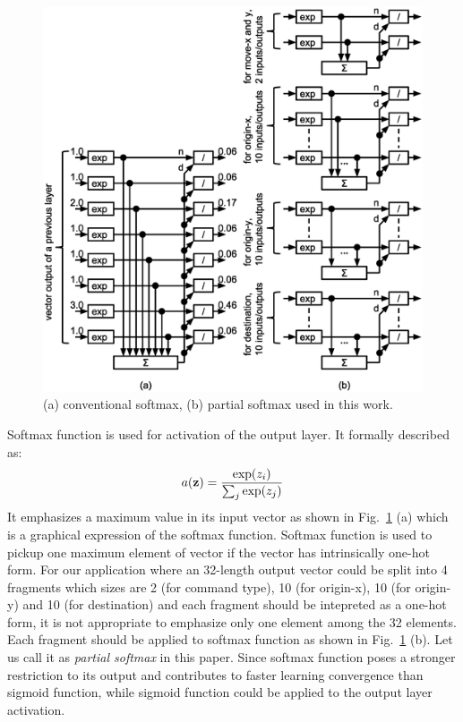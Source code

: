 \documentclass[twocolumn]{article}
\begin{document}
\begin{figure}[!tp]
 \begin{center}
  \begin{minipage}{\hsize}
   \includegraphics[width=\hsize]{fig/partial_softmax_05.eps}
   \caption{(a) conventional softmax, (b) partial softmax used in this work.}
   \label{fig:partial_softmax}
  \end{minipage}
 \end{center}
\end{figure}

Softmax function is used for activation of the output layer.
It formally described as:
\begin{eqnarray}
a({\bf z}) = \frac{\exp(z_i)}{\sum_j \exp(z_j)}
\end{eqnarray}
It emphasizes a maximum value in its input vector
as shown in Fig.\ \ref{fig:partial_softmax} (a)
which is a graphical expression of the softmax function.
Softmax function is used to pickup one maximum element of vector
if the vector has intrinsically one-hot form.
For our application where an 32-length output vector could be split
into 4 fragments which sizes are
2 (for command type), 10 (for origin-x), 10 (for origin-y)
and 10 (for destination)
and each fragment should be intepreted as a one-hot form,
it is not appropriate to emphasize only one element among the 32 elements.
Each fragment should be applied to softmax function
as shown in Fig.\ \ref{fig:partial_softmax} (b).
Let us call it as {\it partial softmax} in this paper.
Since softmax function poses a stronger restriction to its output
and contributes to faster learning convergence than sigmoid function,
while sigmoid function could be applied to the output layer activation.
\end{document}
